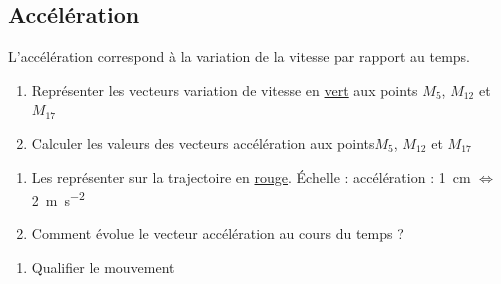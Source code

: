 \documentclass[a4paper,11pt,fleqn]{article}%
\begin{document}
	\subsection*{Accélération}
	L'accélération correspond à la variation de la vitesse par rapport au temps.
	\begin{enumerate}[resume]
	\item Représenter les vecteurs variation de vitesse en \underline{vert} aux points $M_5$, $M_{12}$ et $M_{17}$
	\item Calculer les valeurs des vecteurs accélération aux points$M_5$, $M_{12}$ et $M_{17}$\end{enumerate}
	\noindent {}
	\begin{enumerate}[resume]
	\item Les représenter sur la trajectoire  en \underline{rouge}. Échelle : accélération : \SI{1}{cm} $\Leftrightarrow$ \SI{2}{\meter\per\second\squared}
	\item Comment évolue le vecteur accélération au cours du temps ?\end{enumerate}
	\noindent {}
	\begin{enumerate}[resume]
	\item Qualifier le mouvement\end{enumerate}
	\noindent {}
\end{document}

